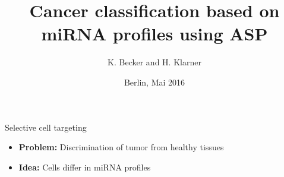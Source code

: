 \documentclass[10pt,dvipsnames]{beamer}
\title{Cancer classification based on miRNA profiles using ASP}
\author{K. Becker and H. Klarner}
\date{Berlin, Mai 2016}
\institute{
Freie Universität Berlin, Germany
}
\begin{document}
\frame{\titlepage}




\begin{frame}{Selective cell targeting}
\begin{itemize}
\item \textbf{Problem:} Discrimination of tumor from healthy tissues
\end{itemize}

\vspace{0.5cm}
\begin{center}
\end{center}
\vspace{0.5cm}

\begin{itemize}
\item<2> \textbf{Idea:} Cells differ in miRNA profiles
\end{itemize}
\end{frame}
\end{document}

